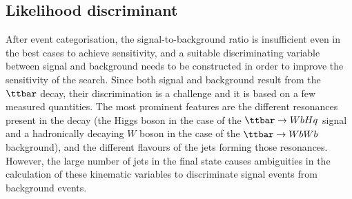 \subsection{Likelihood discriminant}
\label{sec:likelihood_discriminant}

After event categorisation, the signal-to-background ratio is insufficient even in the best cases to achieve sensitivity, and a suitable
discriminating variable between signal and background needs to be constructed in order to improve the sensitivity of the search.
Since both signal and background result from the $\ttbar$ decay, 
their discrimination is a challenge and it is based on a few measured quantities.  
The most prominent features are the different resonances present in the decay (the Higgs boson in the case 
of the $\Hq$ signal and a hadronically decaying $W$ boson in the case of the $\ttbar \to WbWb$ background), and the different flavours of the 
jets forming those resonances. However, the large number of jets in the final state causes ambiguities in the calculation 
of these kinematic variables to discriminate signal events from background events. 

